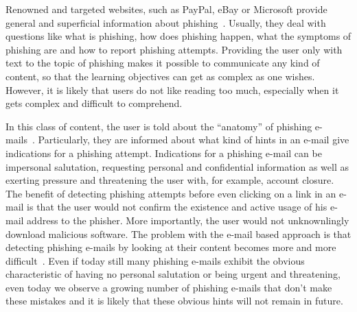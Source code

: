 \begin{description}[leftmargin=0cm]
	\item[General Knowledge Transfer] Renowned and targeted websites, such as PayPal, eBay or Microsoft provide general and superficial information about phishing~\cite{generalknowledgemicrosoft, generalknowledgepaypal, generalknowledgeebay}.
	Usually, they deal with questions like what is phishing, how does phishing happen, what the symptoms of phishing are and how to report phishing attempts.
 Providing the user only with text to the topic of phishing makes it possible to communicate any kind of content, so that the learning objectives can get as complex as one wishes.
 However, it is likely that users do not like reading too much, especially when it gets complex and difficult to comprehend.

	\item[E-Mail Based Knowledge] In this class of content, the user is told about the ``anatomy'' of phishing e-mails~\cite{antiphishingphyllis, sonicwall}. Particularly, they are informed about what kind of hints in an e-mail give indications for a phishing attempt.
 Indications for a phishing e-mail can be impersonal salutation, requesting personal and confidential information as well as exerting pressure and threatening the user with, for example, account closure.
 The benefit of detecting phishing attempts before even clicking on a link in an e-mail is that the user would not confirm the existence and active usage of his e-mail address to the phisher.
 More importantly, the user would not unknownlingly download malicious software.
 The problem with the e-mail based approach is that detecting phishing e-mails by looking at their content becomes more and more difficult~\cite{microsoftphishing,spamfighter}. Even if today still many phishing e-mails exhibit the obvious characteristic of having no personal salutation or being urgent and threatening, even today we observe a growing number of phishing e-mails that don't make these mistakes and it is likely that these obvious hints will not remain in future.


\end{description}
